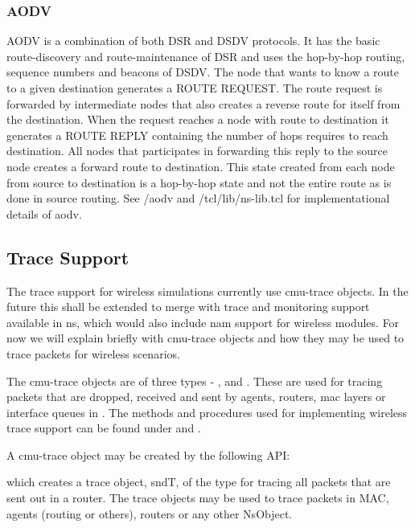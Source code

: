 \subsubsection{AODV}
\label{sec:AODV}

AODV is a combination of both DSR and DSDV protocols. It has the basic
route-discovery and route-maintenance of DSR and uses the hop-by-hop
routing, sequence numbers and beacons of DSDV. The node that wants to know
a route to a given destination generates a ROUTE REQUEST. The route
request is forwarded by intermediate nodes that also creates a reverse
route for itself from the destination. When the request reaches a node
with route to destination it generates a ROUTE REPLY containing the number
of hops requires to reach destination. All nodes that participates in
forwarding this reply to the source node creates a forward route to
destination. This state created from each node from source to destination
is a hop-by-hop state and not the entire route as is done in source
routing.
See \ns/aodv and \ns/tcl/lib/ns-lib.tcl for implementational details
of aodv.


\subsection{Trace Support}
\label{sec:mobile-trace}

The trace support for wireless simulations currently use cmu-trace
objects. In the future this shall be extended to merge with trace and
monitoring support available in ns, which would also include nam support
for wireless modules. For now we will explain briefly with cmu-trace
objects and how they may be used to trace packets for wireless scenarios. 

The cmu-trace objects are of three types - ,
 and . These are used for tracing
packets that are dropped, received and sent by agents, routers, mac layers
or interface queues in \ns. The methods and procedures used for
implementing wireless trace support can be found under
 and .

A cmu-trace object may be created by the following API:
which creates a trace object, sndT, of the type 
for tracing all packets that are sent out in a router. The trace
objects may be used to trace packets in MAC, agents (routing or
others), routers or any other NsObject. 

